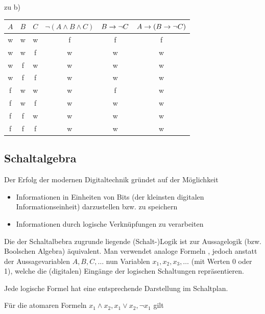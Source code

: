 zu b)

\begin{tabular}{c|c|c|c|c|c}
	$A$ & $B$ & $C$ & $\neg (A\land B\land C)$ & $B\rightarrow\neg C$ & $A\rightarrow (B\rightarrow\neg C)$ \\ 
	\hline 
	w & w & w & f & f & f \\ 
	w & w & f & w & w & w \\ 
	w & f & w & w & w & w \\ 
	w & f & f & w & w & w \\ 
	f & w & w & w & f & w \\ 
	f & w & f & w & w & w \\ 
	f & f & w & w & w & w \\ 
	f & f & f & w & w & w \\ 
\end{tabular} 

\clearpage
\subsection{Schaltalgebra}
Der Erfolg der modernen Digitaltechnik gründet auf der Möglichkeit
\begin{itemize}
	\item Informationen in Einheiten von {\flqq Bits\frqq} (der kleinsten digitalen Informationseinheit) darzustellen bzw. zu speichern
	\item Informationen durch logische Verknüpfungen zu verarbeiten
\end{itemize}

Die der Schaltalbebra zugrunde liegende (Schalt-)Logik ist zur Aussagelogik (bzw. Boolschen Algebra) äquivalent. Man verwendet analoge Formeln , jedoch anstatt der Aussagevariablen $A,B,C,\ldots$ nun Variablen $x_1,x_2,x_3,\ldots$ (mit Werten 0 oder 1), welche die (digitalen) Eingänge der logischen Schaltungen repräsentieren.

Jede logische Formel hat eine entsprechende Darstellung im Schaltplan.

\clearpage
Für die atomaren Formeln $x_1\land x_2, x_1\lor x_2, \neg x_1$ gilt

